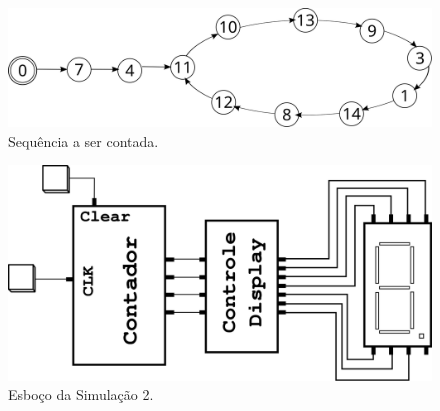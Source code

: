 \documentclass[8pt]{article}
\begin{document}
\begin{figure}[h]
  \centering
  \includegraphics[scale=0.28]{figs/seq_b}
  \caption{Sequência a ser contada.}
  \label{fig:seq}
\end{figure}

\begin{figure}[h]
  \centering
  \includegraphics[scale=0.4]{figs/sim2}
  \caption{Esboço da Simulação 2.}
  \label{fig:sim2}
\end{figure}

\end{document}
